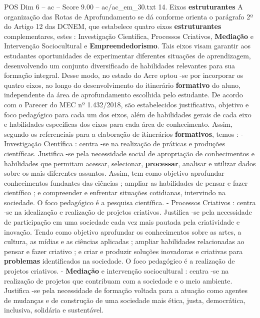 \begin{textsample}{POS Dim 6 – ac – Score 9.00 – ac/ac\_em\_30.txt}  \label{ex:f6_pos_153}
14.
Eixos \textbf{estruturantes} A organização das Rotas de Aprofundamento se dá conforme orienta o parágrafo 2º do Artigo 12 das DCNEM, que estabelece quatro eixos \textbf{estruturantes} complementares, estes : Investigação Científica, Processos Criativos, \textbf{Mediação} e Intervenção Sociocultural e \textbf{Empreendedorismo}.
Tais eixos visam garantir aos estudantes oportunidades de experimentar diferentes situações de aprendizagem, desenvolvendo um conjunto diversificado de habilidades relevantes para sua formação integral.
Desse modo, no estado do Acre optou -se por incorporar os quatro eixos, ao longo do desenvolvimento do itinerário \textbf{formativo} do aluno, independente da área de aprofundamento escolhida pelo estudante.
De acordo com o Parecer do MEC nº 1.432/2018, são estabelecidos justificativa, objetivo e foco pedagógico para cada um dos eixos, além de habilidades gerais de cada eixo e habilidades específicas dos eixos para cada área de conhecimento.
Assim, segundo os referenciais para a elaboração de itinerários \textbf{formativos}, temos : - Investigação Científica : centra -se na realização de práticas e produções científicas.
Justifica -se pela necessidade social de apropriação de conhecimentos e habilidades que permitam acessar, selecionar, \textbf{processar}, analisar e utilizar dados sobre os mais diferentes assuntos.
Assim, tem como objetivo aprofundar conhecimentos fundantes das ciências ; ampliar as habilidades de pensar e fazer científico ; e compreender e enfrentar situações cotidianas, intervindo na sociedade.
O foco pedagógico é a pesquisa científica. - Processos Criativos : centra -se na idealização e realização de projetos criativos.
Justifica -se pela necessidade de participação em uma sociedade cada vez mais pautada pela criatividade e inovação.
Tendo como objetivo aprofundar os conhecimentos sobre as artes, a cultura, as mídias e as ciências aplicadas ; ampliar habilidades relacionadas ao pensar e fazer criativo ; e criar e produzir soluções inovadoras e criativas para \textbf{problemas} identificados na sociedade.
O foco pedagógico é a realização de projetos criativos. - \textbf{Mediação} e intervenção sociocultural : centra -se na realização de projetos que contribuam com a sociedade e o meio ambiente.
Justifica -se pela necessidade de formação voltada para a atuação como agentes de mudanças e de construção de uma sociedade mais ética, justa, democrática, inclusiva, solidária e sustentável.

\end{textsample}
